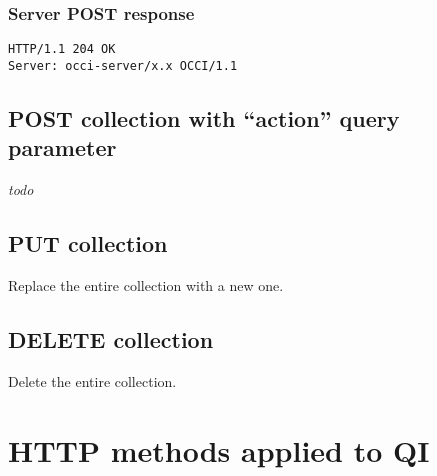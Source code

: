 \documentclass[10pt,a4paper]{article}
\begin{document}
\subsubsection{Server POST response}
\begin{verbatim}
HTTP/1.1 204 OK
Server: occi-server/x.x OCCI/1.1
\end{verbatim}

\subsection{POST collection with ``action'' query parameter}
{\em todo}

\subsection{PUT collection}
Replace the entire collection with a new one. 

\subsection{DELETE collection}
Delete the entire collection. 

\section{HTTP methods applied to QI}


\begin{comment}
\section{More examples}
The OCCI demo instance of occi-py%
\footnote{\tt http://github.com/nyren/occi-py}
running at {\tt http://www.nyren.net/api/} has an early version of the draft
JSON rendering available.  Feel free to play around with it. However, please
note the following limitations:
\begin{itemize}
\item The Content-Type is {\tt application/json} and not {\tt application/occi+json}
which would be more appropriate.
\item It does not support request data in JSON.
\item Filtering and pagination is not yet supported.
\end{itemize}

A few example queries using curl:
\begin{verbatim}
curl -i -H 'accept: application/json' http://www.nyren.net/api/-/
curl -i -H 'accept: application/json' http://www.nyren.net/api/link/
curl -i -X POST -H 'accept: application/json' http://www.nyren.net/api/compute/
\end{verbatim}
\end{comment}
\end{document}
